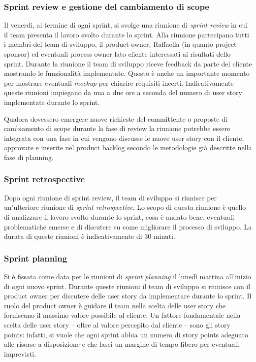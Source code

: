 \subsubsection{Sprint review e gestione del cambiamento di scope}
Il venerdì, al termine di ogni sprint, si svolge una riunione di \emph{sprint review} in cui il team presenta il lavoro svolto durante lo sprint. Alla riunione partecipano tutti i membri del team di sviluppo, il product owner, Raffaella (in quanto project sponsor) ed eventuali process owner lato cliente interessati ai risultati dello sprint.
Durante la riunione il team di sviluppo riceve feedback da parte del cliente mostrando le funzionalità implementate. Questo è anche un importante momento per mostrare eventuali \emph{mockup} per chiarire requisiti incerti.
Indicativamente queste riunioni impiegano da una a due ore a seconda del numero di user story implementate durante lo sprint.

Qualora dovessero emergere nuove richieste del committente o proposte di cambiamento di scope durante la fase di review la riunione potrebbe essere integrata con una fase in cui vengono discusse le nuove user story con il cliente, approvate e inserite nel product backlog secondo le metodologie già descritte nella fase di planning.

\subsubsection{Sprint retrospective}
Dopo ogni riunione di sprint review, il team di sviluppo si riunisce per un'ulteriore riunione di \emph{sprint retrospective}. Lo scopo di questa riunione è quello di analizzare il lavoro svolto durante lo sprint, cosa è andato bene, eventuali problematiche emerse e di discutere su come migliorare il processo di sviluppo.
La durata di queste riunioni è indicativamente di 30 minuti.

\subsubsection{Sprint planning}
Si è fissata come data per le riunioni di \emph{sprint planning} il lunedì mattina all'inizio di ogni nuovo sprint. Durante queste riunioni il team di sviluppo si riunisce con il product owner per discutere delle user story da implementare durante lo sprint. Il ruolo del product owner è guidare il team nella scelta delle user story che forniscano il massimo valore possibile al cliente. Un fattore fondamentale nella scelta delle user story -- oltre al valore percepito dal cliente -- sono gli story points: infatti, si vuole che ogni sprint abbia un numero di story points adeguato alle risorse a disposizione e che lasci un margine di tempo libero per eventuali imprevisti.


